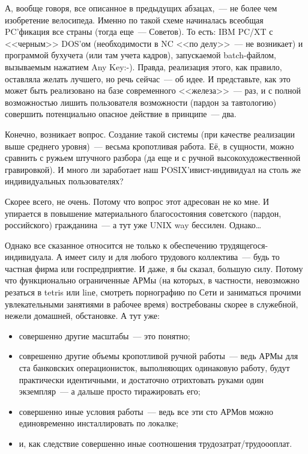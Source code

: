 А, вообще говоря, все описанное в предыдущих абзацах,~--- не более чем изобретение велосипеда. Именно по такой схеме начиналась всеобщая PC'фикация все страны (тогда еще~--- Советов). То есть: IBM PC/XT с <<черным>> DOS'ом (необходимости в NC <<по делу>>~--- не возникает) и программой бухучета (или там учета кадров), запускаемой batch-файлом, вызываемым нажатием Any Key:-). Правда, реализация этого, как правило, оставляла желать лучшего, но речь сейчас~--- об идее. И представьте, как это может быть реализовано на базе современного <<железа>>~--- раз, и с полной возможностью лишить пользователя возможности (пардон за тавтологию) совершить потенциально опасное действие в принципе~--- два.

Конечно, возникает вопрос. Создание такой системы (при качестве реализации выше среднего уровня)~--- весьма кропотливая работа. Её, в сущности, можно сравнить с ружьем штучного разбора (да еще и с ручной высокохудожественной гравировкой). И много ли заработает наш POSIX'ивист-индивидуал на столь же индивидуальных пользователях?

Скорее всего, не очень. Потому что вопрос этот адресован не ко мне. И упирается в повышение материального благосостояния советского (пардон, российского) гражданина~--- а тут уже UNIX way бессилен. Однако\dots

Однако все сказанное относится не только к обеспечению трудящегося-индивидуала. А имеет силу и для любого трудового коллектива~--- будь то частная фирма или госпредприятие. И даже, я бы сказал, большую силу. Потому что функционально ограниченные АРМы (на которых, в частности, невозможно резаться в tetris или linе, смотреть порнографию по Сети и заниматься прочими увлекательными занятиями в рабочее время) востребованы скорее в служебной, нежели домашней, обстановке. А тут уже:


\begin{itemize}
	\item совершенно другие масштабы~--- это понятно; 
	\item соврешенно другие объемы кропотливой ручной работы~--- ведь АРМы для ста банковских операционисток, выполняющих одинаковую работу, будут практически идентичными, и достаточно отрихтовать руками один экземпляр~--- а дальше просто тиражировать его;
	\item совершенно иные условия работы~--- ведь все эти сто АРМов можно единовременно инсталлировать по локалке;
	\item и, как следствие совершенно иные соотношения трудозатрат/трудоооплат.
\end{itemize}


